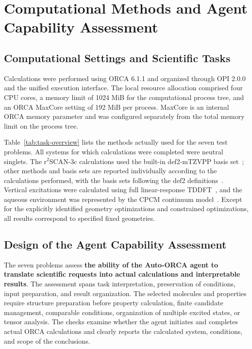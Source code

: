 \section{Computational Methods and Agent Capability Assessment}
\subsection{Computational Settings and Scientific Tasks}
Calculations were performed using ORCA 6.1.1 and organized through OPI 2.0.0 and the unified execution interface.
The local resource allocation comprised four CPU cores, a memory limit of 1024 MiB for the computational process tree,
and an ORCA MaxCore setting of 192 MiB per process.
MaxCore is an internal ORCA memory parameter and was configured separately from the total memory limit on the process tree.

Table~\ref{tab:task-overview} lists the methods actually used for the seven test problems.
All systems for which calculations were completed were neutral singlets.
The r$^{2}$SCAN-3c calculations used the built-in def2-mTZVPP basis set~\cite{r2scan3c};
other methods and basis sets are reported individually according to the calculations performed,
with the basis sets following the def2 definitions~\cite{def2}.
Vertical excitations were calculated using full linear-response TDDFT~\cite{tddft},
and the aqueous environment was represented by the CPCM continuum model~\cite{cpcm}.
Except for the explicitly identified geometry optimizations and constrained optimizations,
all results correspond to specified fixed geometries.

\subsection{Design of the Agent Capability Assessment}
\label{sec:agent-evaluation-design}
The seven problems assess \textbf{the ability of the Auto-ORCA agent to translate scientific requests
into actual calculations and interpretable results}.
The assessment spans task interpretation, preservation of conditions, input preparation, and result organization.
The selected molecules and properties require structure preparation before property calculation,
finite candidate management, comparable conditions, organization of multiple excited states, or tensor analysis.
The checks examine whether the agent initiates and completes actual ORCA calculations
and clearly reports the calculated system, conditions, and scope of the conclusions.


